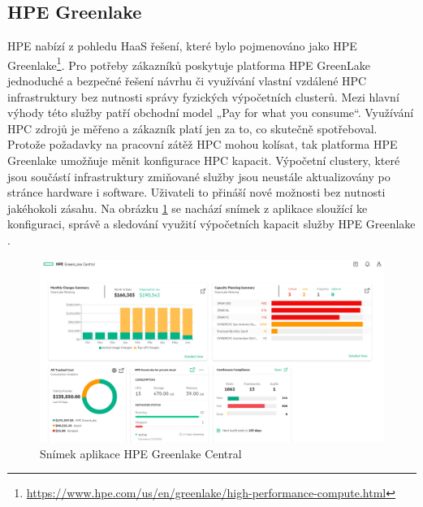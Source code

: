 \subsection{HPE Greenlake}
HPE nabízí z pohledu HaaS řešení, které bylo pojmenováno jako HPE Greenlake\footnote{\href{https://www.hpe.com/us/en/greenlake/high-performance-compute.html}{https://www.hpe.com/us/en/greenlake/high-performance-compute.html}}. Pro potřeby zákazníků poskytuje platforma HPE GreenLake jednoduché a bezpečné řešení návrhu či využívání vlastní vzdálené HPC infrastruktury bez nutnosti správy fyzických výpočetních clusterů. Mezi hlavní výhody této služby patří obchodní model „Pay for what you consume“. Využívání HPC zdrojů je měřeno a zákazník platí jen za to, co skutečně spotřeboval. Protože požadavky na pracovní zátěž HPC mohou kolísat, tak platforma HPE Greenlake umožňuje měnit konfigurace HPC kapacit. Výpočetní clustery, které jsou součástí infrastruktury zmiňované služby jsou neustále aktualizovány po stránce hardware i software. Uživateli to přináší nové možnosti bez nutnosti jakéhokoli zásahu. Na obrázku \ref{fig:greenlake} se nachází snímek z aplikace sloužící ke konfiguraci, správě a sledování využití výpočetních kapacit služby HPE Greenlake \cite{IN09sfzqoa3sLbg4}.

\begin{figure}[!h]
	\centering
	\includegraphics[width=1\textwidth]{Figures/hpe-greenlake-central.png}
	\caption{Snímek aplikace HPE Greenlake Central \cite{Showalter20200616}}
	\label{fig:greenlake}
\end{figure}
\newpage

